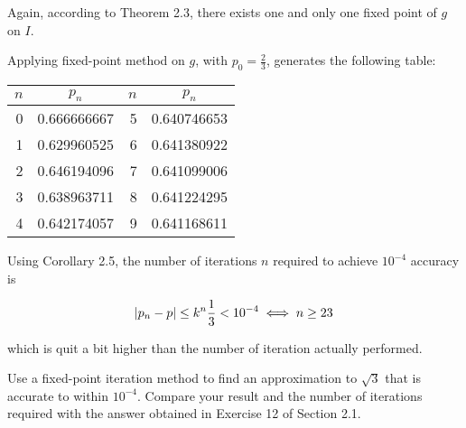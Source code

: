 \documentclass[../../../../Assignments]{subfiles}
\begin{document}
\begin{solution}
    Again, according to Theorem 2.3, there exists one and only one fixed point
    of \(g\) on \(I\).

    Applying fixed-point method on \(g\), with \(p_0 = \frac{2}{3}\), generates
    the following table:

    \begin{table}[H]
        \centering
        \begin{tabular}{r S[table-format=1.9] r S[table-format=1.9]}
            \toprule
            \(n\)  &   {\(p_n\)}   &  \(n\)  &   {\(p_n\)}   \\
              &  0.666666667  &      5  &  0.640746653  \\
                1  &  0.629960525  &      6  &  0.641380922  \\
                2  &  0.646194096  &      7  &  0.641099006  \\
                3  &  0.638963711  &      8  &  0.641224295  \\
                4  &  0.642174057  &      9  &  0.641168611  \\
            \bottomrule
        \end{tabular}
    \end{table}

    Using Corollary 2.5, the number of iterations \(n\) required to achieve
    \(10^{-4}\) accuracy is

    \[\abs{p_n - p} \leq k^n \frac{1}{3} < 10^{-4} \iff n \geq 23\]

    \noindent which is quit a bit higher than the number of iteration actually
    performed.
\end{solution}

\begin{exercise}
    Use a fixed-point iteration method to find an approximation to \(\sqrt{3}\)
    that is accurate to within \(10^{-4}\). Compare your result and the number
    of iterations required with the answer obtained in Exercise 12 of Section
    2.1.
\end{exercise}
\end{document}
